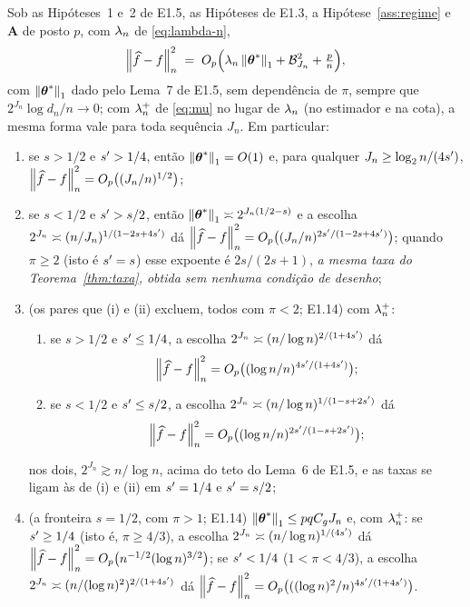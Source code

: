 \documentclass[11pt,a4paper]{article}
\newcommand{\Amat}{\mathbf{A}}
\begin{document}
\begin{proposition}\label{prop:lenta}
Sob as Hipóteses~1 e~2 de E1.5, as Hipóteses de E1.3, a
Hipótese~\ref{ass:regime} e $\Amat$ de posto $p$, com $\lambda_{n}$ de
\eqref{eq:lambda-n},
\[
  \left\lVert \widehat f - f \right\rVert_{n}^{2}
  \;=\; O_{p}\Bigl(\lambda_{n}\left\lVert \boldsymbol{\theta}^{*} \right\rVert_{1} + \mathcal{B}_{J_{n}}^{2}
  + \tfrac{p}{n}\Bigr),
\]
com $\left\lVert \boldsymbol{\theta}^{*} \right\rVert_{1}$ dado pelo Lema~7 de E1.5, sem dependência de
$\pi$, sempre que $2^{J_{n}}\log d_{n}/n \to 0$; com $\lambda_{n}^{+}$ de
\eqref{eq:mu} no lugar de $\lambda_{n}$ (no estimador e na cota), a mesma forma
vale para toda sequência $J_{n}$. Em particular:
\begin{enumerate}[label=\textup{(\roman*)}, leftmargin=*, nosep]
  \item se $s > 1/2$ e $s' > 1/4$, então $\left\lVert \boldsymbol{\theta}^{*} \right\rVert_{1} = O(1)$ e, para qualquer
    $J_{n} \ge \log_{2}n/(4s')$,
    $\left\lVert \widehat f - f \right\rVert_{n}^{2} = O_{p}\bigl((J_{n}/n)^{1/2}\bigr)$;
  \item se $s < 1/2$ e $s' > s/2$, então $\left\lVert \boldsymbol{\theta}^{*} \right\rVert_{1} \asymp 2^{J_{n}(1/2-s)}$ e a
    escolha $2^{J_{n}} \asymp (n/J_{n})^{1/(1-2s+4s')}$ dá
    $\left\lVert \widehat f - f \right\rVert_{n}^{2} =
    O_{p}\bigl((J_{n}/n)^{2s'/(1-2s+4s')}\bigr)$; quando $\pi \ge 2$
    (isto é $s' = s$) esse expoente é $2s/(2s+1)$, \emph{a mesma taxa do
    Teorema~\ref{thm:taxa}, obtida sem nenhuma condição de desenho};
  \item \textup{(os pares que (i) e (ii) excluem, todos com $\pi < 2$; E1.14)}
    com $\lambda_{n}^{+}$:
    \begin{enumerate}[label=\textup{(\alph*)}, leftmargin=*, nosep]
      \item se $s > 1/2$ e $s' \le 1/4$, a escolha
        $2^{J_{n}} \asymp (n/\log n)^{2/(1+4s')}$ dá
        \[
          \left\lVert \widehat f - f \right\rVert_{n}^{2} =
          O_{p}\bigl((\log n/n)^{4s'/(1+4s')}\bigr);
        \]
      \item se $s < 1/2$ e $s' \le s/2$, a escolha
        $2^{J_{n}} \asymp (n/\log n)^{1/(1-s+2s')}$ dá
        \[
          \left\lVert \widehat f - f \right\rVert_{n}^{2} =
          O_{p}\bigl((\log n/n)^{2s'/(1-s+2s')}\bigr);
        \]
    \end{enumerate}
    nos dois, $2^{J_{n}} \gtrsim n/\log n$, acima do teto do Lema~6 de E1.5, e
    as taxas se ligam às de (i) e (ii) em $s' = 1/4$ e $s' = s/2$;
  \item \textup{(a fronteira $s = 1/2$, com $\pi > 1$; E1.14)}
    $\left\lVert \boldsymbol{\theta}^{*} \right\rVert_{1} \le pqC_{g}J_{n}$ e, com $\lambda_{n}^{+}$: se
    $s' \ge 1/4$ (isto é, $\pi \ge 4/3$), a escolha
    $2^{J_{n}} \asymp (n/\log n)^{1/(4s')}$ dá
    $\left\lVert \widehat f - f \right\rVert_{n}^{2} = O_{p}\bigl(n^{-1/2}(\log n)^{3/2}\bigr)$; se
    $s' < 1/4$ ($1 < \pi < 4/3$), a escolha
    $2^{J_{n}} \asymp (n/(\log n)^{2})^{2/(1+4s')}$ dá
    $\left\lVert \widehat f - f \right\rVert_{n}^{2} =
    O_{p}\bigl(((\log n)^{2}/n)^{4s'/(1+4s')}\bigr)$.
\end{enumerate}
\end{proposition}
\end{document}
